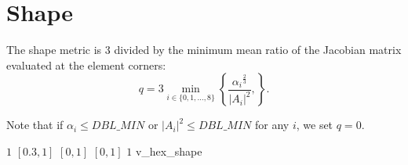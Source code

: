 \section{Shape\label{s:hex-shape}}

The shape metric is 3 divided by the minimum mean ratio
of the Jacobian matrix evaluated at the element corners:
\[
  q = 3\min_{i\in\{0,1,\ldots,8\}}
  \left\{
    \frac{{\alpha_i}^{\frac {2}{3}}} {|A_i|^2}, 
  \right\}.
\]

Note that if $\alpha_i \leq DBL\_MIN$ or $|A_i|^2 \leq DBL\_MIN$ for any $i$, we set $q = 0$.

%
{$1$}%
{$[0.3,1]$}%
{$[0,1]$}%
{$[0,1]$}%
{$1$}%
{\cite{knu:03}}%
{v\_hex\_shape}%
